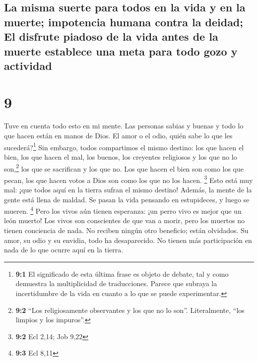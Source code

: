\hypertarget{la-misma-suerte-para-todos-en-la-vida-y-en-la-muerte-impotencia-humana-contra-la-deidad-el-disfrute-piadoso-de-la-vida-antes-de-la-muerte-establece-una-meta-para-todo-gozo-y-actividad}{%
\subsection{La misma suerte para todos en la vida y en la muerte;
impotencia humana contra la deidad; El disfrute piadoso de la vida antes
de la muerte establece una meta para todo gozo y
actividad}\label{la-misma-suerte-para-todos-en-la-vida-y-en-la-muerte-impotencia-humana-contra-la-deidad-el-disfrute-piadoso-de-la-vida-antes-de-la-muerte-establece-una-meta-para-todo-gozo-y-actividad}}

\hypertarget{section-8}{%
\section{9}\label{section-8}}

 Tuve en cuenta todo esto en mi mente. Las personas sabias
y buenas y todo lo que hacen están en manos de Dios. El amor o el odio,
quién sabe lo que les sucederá?\footnote{\textbf{9:1} El significado de
  esta última frase es objeto de debate, tal y como demuestra la
  multiplicidad de traducciones. Parece que subraya la incertidumbre de
  la vida en cuanto a lo que se puede experimentar.}  Sin
embargo, todos compartimos el mismo destino: los que hacen el bien, los
que hacen el mal, los buenos, los creyentes religiosos y los que no lo
son,\footnote{\textbf{9:2} ``Los religiosamente observantes y los que no
  lo son''. Literalmente, ``los limpios y los impuros''.} los que se
sacrifican y los que no. Los que hacen el bien son como los que pecan,
los que hacen votos a Dios son como los que no los hacen. \footnote{\textbf{9:2}
  Ecl 2,14; Job 9,22}  Esto está muy mal: ¡que todos aquí
en la tierra sufran el mismo destino! Además, la mente de la gente está
llena de maldad. Se pasan la vida pensando en estupideces, y luego se
mueren. \footnote{\textbf{9:3} Ecl 8,11}  Pero los vivos
aún tienen esperanza: ¡un perro vivo es mejor que un león muerto!
 Los vivos son conscientes de que van a morir, pero los
muertos no tienen conciencia de nada. No reciben ningún otro beneficio;
están olvidados.  Su amor, su odio y su envidia, todo ha
desaparecido. No tienen más participación en nada de lo que ocurre aquí
en la tierra.

